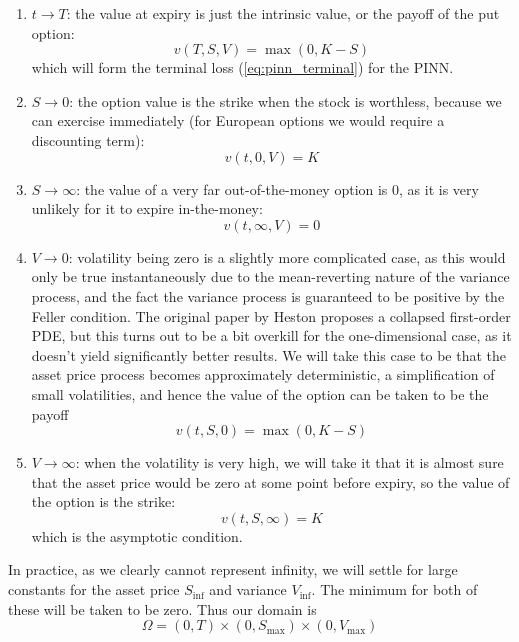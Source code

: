 \begin{enumerate}
    \item $t \to T$: the value at expiry is just the intrinsic value, or the payoff of the put option:
    \begin{equation}
        v(T, S, V) = \max (0, K-S)
    \end{equation}
    which will form the terminal loss (\ref{eq:pinn_terminal}) for the PINN.
    \item $S\to 0$: the option value is the strike when the stock is worthless, because we can exercise immediately (for European options we would require a discounting term):
    \begin{equation}
        v(t, 0, V) = K
    \end{equation}
    \item $S\to \infty$: the value of a very far out-of-the-money option is 0, as it is very unlikely for it to expire in-the-money:
    \begin{equation}
        v(t, \infty, V) = 0
    \end{equation}
    \item $V \to 0$: volatility being zero is a slightly more complicated case, as this would only be true instantaneously due to the mean-reverting nature of the variance process, and the fact the variance process is guaranteed to be positive by the Feller condition. The original paper by Heston \cite{heston1993closed} proposes a collapsed first-order PDE, but this turns out to be a bit overkill for the one-dimensional case, as it doesn't yield significantly better results. We will take this case to be that the asset price process becomes approximately deterministic, a simplification of small volatilities, and hence the value of the option can be taken to be the payoff
    \begin{equation}
        v(t, S, 0) = \max(0, K - S)
    \end{equation}
    \item $V \to \infty$: when the volatility is very high, we will take it that it is almost sure that the asset price would be zero at some point before expiry, so the value of the option is the strike:
    \begin{equation}
        v(t, S, \infty) = K
    \end{equation}
    which is the asymptotic condition.
\end{enumerate}

In practice, as we clearly cannot represent infinity, we will settle for large constants for the asset price $S_\text{inf}$ and variance $V_\text{inf}$. The minimum for both of these will be taken to be zero. Thus our domain is
\begin{equation}
    \Omega = (0, T) \times (0, S_\text{max}) \times (0, V_\text{max})
\end{equation}

